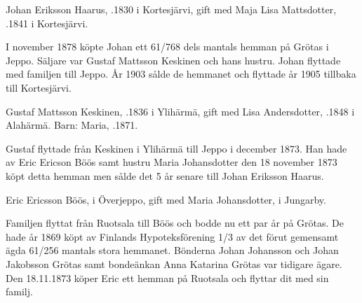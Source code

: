 Johan Eriksson Haarus, .1830 i Kortesjärvi, gift med Maja Lisa Mattsdotter, .1841 i Kortesjärvi.
\begin{jhchildren}
  \item {}
  \item {}
  \item {}
  \item {}
  \item {}
  \item {}
  \item {}
\end{jhchildren}
I november 1878 köpte Johan ett 61/768 dels mantals hemman på Grötas i Jeppo. Säljare var Gustaf Mattsson Keskinen och hans hustru. Johan flyttade med familjen till Jeppo. År 1903 sålde de hemmanet och flyttade år 1905 tillbaka till Kortesjärvi.


Gustaf Mattsson Keskinen, .1836  i Ylihärmä, gift med Lisa Andersdotter, .1848 i Alahärmä.
Barn: Maria, .1871.

Gustaf flyttade från Keskinen i Ylihärmä till Jeppo i december 1873. Han hade av Eric Ericson Böös samt hustru Maria Johansdotter den 18 november 1873 köpt detta hemman men sålde det 5 år senare till Johan Eriksson Haarus.


Eric Ericsson Böös,  i Överjeppo, gift med Maria Johansdotter,  i Jungarby.
\begin{jhchildren}
  \item {}
  \item {}
\end{jhchildren}
Familjen flyttat från Ruotsala till Böös och bodde nu ett par år på Grötas. De hade år 1869 köpt av Finlands Hypoteksförening 1/3 av det förut gemensamt ägda 61/256 mantals stora hemmanet. Bönderna Johan Johansson och Johan Jakobsson Grötas samt bondeänkan Anna Katarina Grötas var tidigare ägare. Den 18.11.1873 köper Eric ett hemman på Ruotsala och flyttar dit med sin familj.



